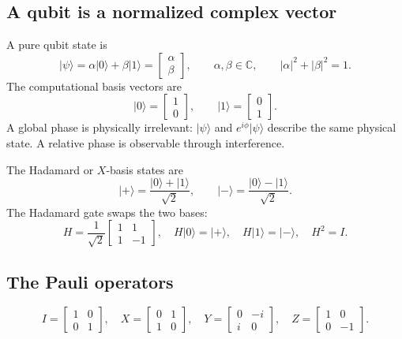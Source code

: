 \documentclass[11pt]{article}
\providecommand{\ket}[1]{\lvert #1\rangle}
\begin{document}
\subsection{A qubit is a normalized complex vector}

A pure qubit state is
\[
  \ket{\psi}=\alpha\ket{0}+\beta\ket{1}
  =\begin{bmatrix}\alpha\\\beta\end{bmatrix},
  \qquad \alpha,\beta\in\mathbb{C},
  \qquad |\alpha|^2+|\beta|^2=1.
\]
The computational basis vectors are
\[
  \ket{0}=\begin{bmatrix}1\\0\end{bmatrix},\qquad
  \ket{1}=\begin{bmatrix}0\\1\end{bmatrix}.
\]
A global phase is physically irrelevant: \(\ket{\psi}\) and \(e^{i\phi}\ket{\psi}\) describe the
same physical state. A relative phase is observable through interference.

The Hadamard or \(X\)-basis states are
\[
  \ket{+}=\frac{\ket{0}+\ket{1}}{\sqrt{2}},\qquad
  \ket{-}=\frac{\ket{0}-\ket{1}}{\sqrt{2}}.
\]
The Hadamard gate swaps the two bases:
\[
  H=\frac{1}{\sqrt{2}}\begin{bmatrix}1&1\\1&-1\end{bmatrix},
  \quad H\ket{0}=\ket{+},\quad H\ket{1}=\ket{-},\quad H^2=I.
\]

\subsection{The Pauli operators}

\[
I=\begin{bmatrix}1&0\\0&1\end{bmatrix},\quad
X=\begin{bmatrix}0&1\\1&0\end{bmatrix},\quad
Y=\begin{bmatrix}0&-i\\i&0\end{bmatrix},\quad
Z=\begin{bmatrix}1&0\\0&-1\end{bmatrix}.
\]
\end{document}
